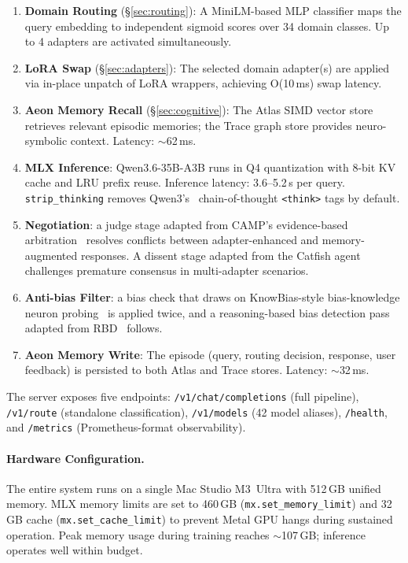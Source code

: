 \documentclass[11pt,a4paper]{article}
\begin{document}
\begin{enumerate}[nosep]
  \item \textbf{Domain Routing} (\S\ref{sec:routing}): A MiniLM-based MLP classifier maps the query embedding to independent sigmoid scores over 34 domain classes. Up to 4 adapters are activated simultaneously.
  \item \textbf{LoRA Swap} (\S\ref{sec:adapters}): The selected domain adapter(s) are applied via in-place unpatch of LoRA wrappers, achieving O(10\,ms) swap latency.
  \item \textbf{Aeon Memory Recall} (\S\ref{sec:cognitive}): The Atlas SIMD vector store retrieves relevant episodic memories; the Trace graph store provides neuro-symbolic context. Latency: $\sim$62\,ms.
  \item \textbf{MLX Inference}: Qwen3.6-35B-A3B runs in Q4 quantization with 8-bit KV cache and LRU prefix reuse. Inference latency: 3.6--5.2\,s per query. \texttt{strip\_thinking} removes Qwen3's~\citep{qwen3_2025} chain-of-thought \texttt{<think>} tags by default.
  \item \textbf{Negotiation}: a judge stage adapted from CAMP's evidence-based arbitration~\citep{camp2026} resolves conflicts between adapter-enhanced and memory-augmented responses. A dissent stage adapted from the Catfish agent~\citep{catfish2025} challenges premature consensus in multi-adapter scenarios.
  \item \textbf{Anti-bias Filter}: a bias check that draws on KnowBias-style bias-knowledge neuron probing~\citep{knowbias2025} is applied twice, and a reasoning-based bias detection pass adapted from RBD~\citep{rbd2025} follows.
  \item \textbf{Aeon Memory Write}: The episode (query, routing decision, response, user feedback) is persisted to both Atlas and Trace stores. Latency: $\sim$32\,ms.
\end{enumerate}

The server exposes five endpoints: \texttt{/v1/chat/completions} (full pipeline), \texttt{/v1/route} (standalone classification), \texttt{/v1/models} (42 model aliases), \texttt{/health}, and \texttt{/metrics} (Prometheus-format observability).

\paragraph{Hardware Configuration.}
The entire system runs on a single Mac Studio M3~Ultra with 512\,GB unified memory. MLX memory limits are set to 460\,GB (\texttt{mx.set\_memory\_limit}) and 32\,GB cache (\texttt{mx.set\_cache\_limit}) to prevent Metal GPU hangs during sustained operation. Peak memory usage during training reaches $\sim$107\,GB; inference operates well within budget.
\end{document}
